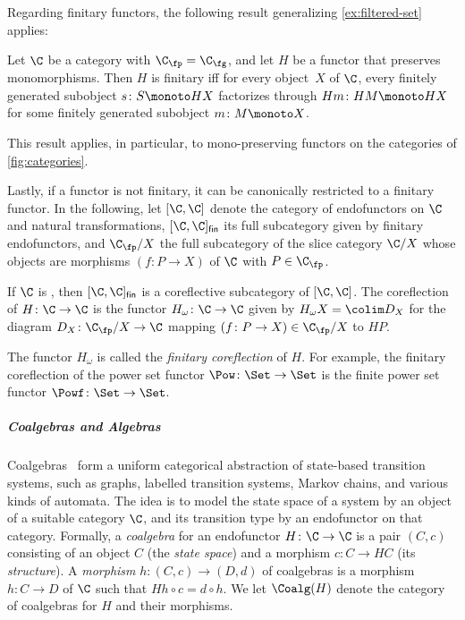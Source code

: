 Regarding finitary functors, the following result generalizing \autoref{ex:filtered-set} applies:

\begin{notheorembrackets}
\begin{lemma}\label{lem:finitary-criterion}
Let $\C$ be a \lfp category with $\C_\fp = \C_\fg$, and let $H$ be a functor that preserves monomorphisms. Then $H$ is finitary iff for every object~$X$ of $\C$, every finitely generated subobject $s\colon S\monoto HX$ factorizes through $Hm\colon HM\monoto HX$ for some finitely generated subobject $m\colon M\monoto X$.  
\end{lemma}
\end{notheorembrackets}
This result applies, in particular, to mono-preserving functors on the categories of \autoref{fig:categories}.

Lastly, if a functor is not finitary, it can be canonically restricted to a finitary functor. In the following, let $[\C,\C]$ denote the category of endofunctors on $\C$ and natural transformations, $[\C,\C]_{\mathsf{fin}}$ its full subcategory given by finitary endofunctors, and $\C_\fp/X$ the full subcategory of the slice category $\C/X$ whose objects are morphisms $(f\colon P\to X)$ of $\C$ with $P\in \C_\fp$.

\begin{notheorembrackets}
\begin{lemma}\label{lem:finitary-coreflection}
If $\C$ is \lfp, then $[\C,\C]_{\mathsf{fin}}$ is a coreflective subcategory of $[\C,\C]$. The coreflection of $H\colon \C\to \C$ is the functor $H_\omega\colon \C\to\C$ given by $H_\omega X=\colim D_X$ for the diagram $D_X\colon \C_\fp/X\to \C$ mapping $(f\colon P\to X)\in \C_\fp/X$ to $HP$.   
\end{lemma}
\end{notheorembrackets}
The functor $H_\omega$ is called the \emph{finitary coreflection} of $H$. For example, the finitary coreflection of the power set functor $\Pow\colon \Set\to \Set$ is the finite power set functor $\Powf\colon \Set\to \Set$.

\subparagraph*{Coalgebras and Algebras} 

Coalgebras~\cite{jacobs16,rutten00} form a uniform categorical abstraction of state-based transition systems, such as graphs, labelled transition systems, Markov chains, and various kinds of automata. The idea is to model the state space of a system by an object of a suitable category $\C$, and its transition type by an endofunctor on that category. Formally, a \emph{coalgebra} for an endofunctor $H\colon \C\to \C$ is a pair $(C,c)$ consisting of an object $C$ (the
\emph{state space}) and a morphism $c\colon C\to HC$ (its
\emph{structure}). A \emph{morphism} $h\colon (C,c)\to (D,d)$ of coalgebras is a morphism $h\colon C\to D$ of $\C$ such that $Hh\circ c = d\circ h$. We let $\Coalg(H)$ denote the category of coalgebras for $H$ and their morphisms. 

